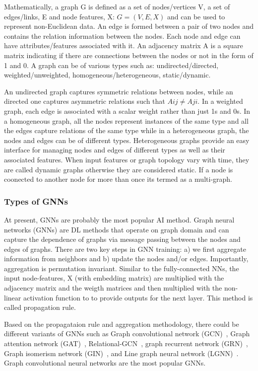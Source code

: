 \documentclass[pdflatex,sn-mathphys]{sn-jnl}%
\theoremstyle{thmstyleone}%
\theoremstyle{thmstyletwo}%
\theoremstyle{thmstylethree}%
\begin{document}
Mathematically, a graph G is defined as a set of nodes/vertices V, a set of edges/links, E and node features, X: $G = (V,E,X)$ \cite{west2001introduction,wang2019deep} and can be used to represent non-Euclidean data. An edge is formed between a pair of two nodes and contains the relation information between the nodes. Each node and edge can have attributes/features associated with it. An adjacency matrix A is a square matrix  indicating if there are connections between the nodes or not in the form of 1 and 0. A graph can be of various types such as: undirected/directed, weighted/unweighted, homogeneous/heterogeneous, static/dynamic. 

An undirected graph captures symmetric relations between nodes, while an directed one captures asymmetric relations such that $Aij \neq Aji$. In a weighted graph, each edge is associated with a scalar weight rather than just 1s and 0s. In a homogeneous graph, all the nodes represent instances of the same type and all the edges capture relations of the same type while in a heterogeneous graph, the nodes and edges can be of different types. Heterogeneous graphs provide an easy interface for managing nodes and edges of different types as well as their associated features. When input features or graph topology vary with time, they are called dynamic graphs otherwise they are considered static. If a node is coonected to another node for more than once its termed as a multi-graph.

\subsubsection{Types of GNNs}
At present, GNNs are probably the most popular AI method.
Graph neural networks (GNNs) are DL methods that operate on graph domain and can capture the dependence of graphs via message passing between the nodes and edges of graphs. There are two key steps in GNN training: a) we first aggregate information from neighbors and b) update the nodes and/or edges. Importantly, aggregation is permutation invariant. Similar to the fully-connected NNs, the input node-features, X (with embedding matrix) are multiplied with the adjacency matrix and the weigth matrices and then multiplied with the non-linear activation function to to provide outputs for the next layer. This method is called propagation rule.

Based on the propagataion rule and aggregation methodology, there could be different variants of GNNs such as Graph convolutional network (GCN)~\cite{kipf2016semi}, Graph attention network (GAT)~\cite{velivckovic2017graph}, Relational-GCN~\cite{schlichtkrull2017modeling}, graph recurrent network (GRN)~\cite{song-etal-2018-graph}, Graph isomerism network (GIN)~\cite{xu2018powerful}, and Line graph neural network (LGNN)~\cite{chen2017supervised}.
Graph convolutional neural networks are the most popular GNNs. 
\end{document}
